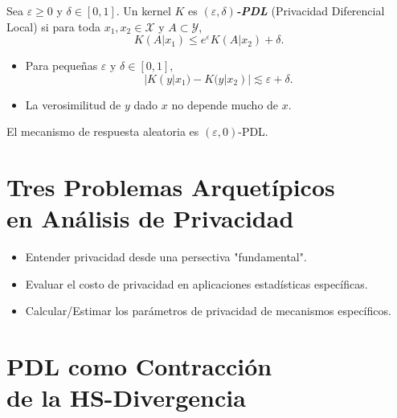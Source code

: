 \begin{definition}\cite{evfimievski2003limiting}
    Sea $\varepsilon\geq0$ y $\delta\in[0,1]$. Un kernel $K$ es \textit{\textbf{$(\varepsilon,\delta)$-PDL}} (Privacidad Diferencial Local) si para toda $x_1,x_2\in\mathcal{X}$ y $A\subset\mathcal{Y}$,
    \begin{equation*}
        K(A|x_1)\leq e^\varepsilon K(A|x_2)+\delta.
    \end{equation*}
\end{definition}

\begin{itemize}
    \item Para pequeñas $\varepsilon$ y $\delta\in[0,1]$, 
    \begin{equation*}
        |K(y|x_1)-K(y|x_2)|\lesssim\varepsilon+\delta.
    \end{equation*}
    \item La verosimilitud de $y$ dado $x$ no depende mucho de $x$. 
\end{itemize}

\begin{example}\cite{evfimievski2003limiting}
El mecanismo de respuesta aleatoria es $(\varepsilon,0)$-PDL.
\end{example}

\section{Tres Problemas Arquet\'ipicos\\ en An\'alisis de Privacidad}

\begin{itemize}
    \item Entender privacidad desde una persectiva "fundamental". 
    \item Evaluar el costo de privacidad en aplicaciones estad\'isticas espec\'ificas.
    \item Calcular/Estimar los par\'ametros de privacidad de mecanismos espec\'ificos. 
\end{itemize}

\section{PDL como Contracci\'on\\ de la HS-Divergencia}

